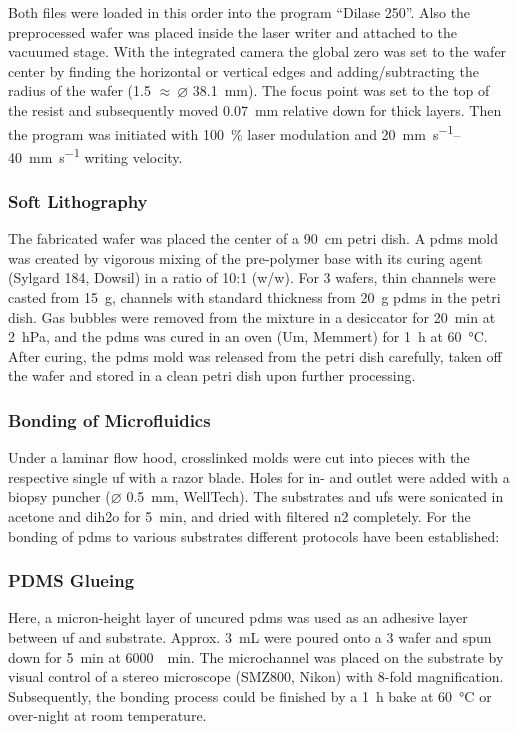 Both files were loaded in this order into the program ``Dilase 250''. Also the preprocessed wafer was placed inside the laser writer and attached to the vacuumed stage. With the integrated camera the global zero was set to the wafer center by finding the horizontal or vertical edges and adding/subtracting the radius of the wafer (\SI{1.5}{\inch} $\approx\ \varnothing $  \SI{38.1}{\milli\meter}). The focus point was set to the top of the resist and subsequently moved \SI{.07}{\milli\meter} relative down for thick layers. Then the program was initiated with \SI{100}{\percent} laser modulation and \SIrange{20}{40}{\milli\meter\per\second} writing velocity.

\subsubsection{Soft Lithography}
The fabricated wafer was placed the center of a \SI{90}{\centi\meter} petri dish. A \gls{pdms} mold was created by vigorous mixing of the pre-polymer base with its curing agent (Sylgard 184, Dowsil) in a ratio of 10:1 (w/w). For \SI{3}{\inch} wafers, thin channels were casted from \SI{15}{\gram}, channels with standard thickness from \SI{20}{\gram} \gls{pdms} in the petri dish. Gas bubbles were removed from the mixture in a desiccator for \SI{20}{\minute} at \SI{2}{\hecto\pascal}, and the \gls{pdms} was cured in an oven (Um, Memmert) for \SI{1}{\hour} at \SI{60}{\degreeCelsius}. After curing, the \gls{pdms} mold was released from the petri dish carefully, taken off the wafer and stored in a clean petri dish upon further processing.  

\subsubsection{Bonding of Microfluidics}
Under a laminar flow hood, crosslinked molds were cut into pieces with the respective single \gls{uf} with a razor blade. Holes for in- and outlet were added with a biopsy puncher ($\varnothing$ \SI{0.5}{\milli\meter}, WellTech). The substrates and \glspl{uf} were sonicated in acetone and \gls{dih2o} for \SI{5}{\minute}, and dried with filtered \gls{n2} completely. For the bonding of \gls{pdms} to various substrates different protocols have been established:

\subsubsection{PDMS Glueing}
\label{sec:meth:bond:glue}
Here, a micron-height layer of uncured \gls{pdms} was used as an adhesive layer between \gls{uf} and substrate. Approx. \SI{3}{\milli\liter} were poured onto a \SI{3}{\inch} wafer and spun down for \SI{5}{\minute} at \SI{6000}{\per\minute}. The microchannel was placed on the substrate by visual control of a stereo microscope (SMZ800, Nikon) with 8-fold magnification. Subsequently, the bonding process could be finished by a \SI{1}{\hour} bake at \SI{60}{\degreeCelsius} or over-night at room temperature.
